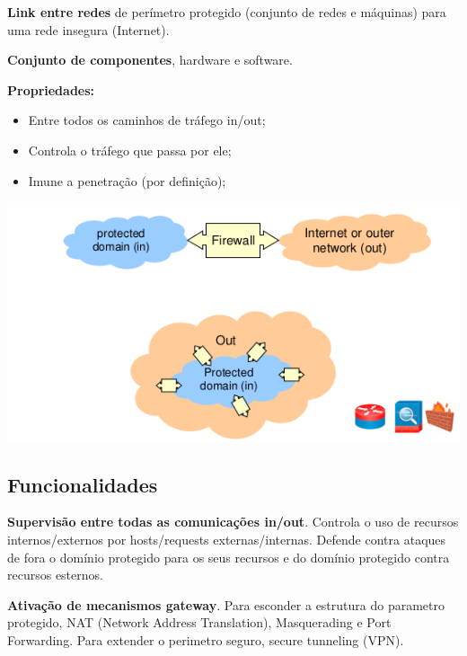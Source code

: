 \documentclass{article}
\begin{document}
\begin{flushleft}
  \textbf{Link entre redes} de perímetro protegido (conjunto de redes e
  máquinas) para uma rede insegura (Internet).

  \vspace{2mm}

  \textbf{Conjunto de componentes}, hardware e software.

  \vspace{2mm}  

  \textbf{Propriedades:}
  \begin{itemize}
    \item Entre todos os caminhos de tráfego in/out;
    \item Controla o tráfego que passa por ele;
    \item Imune a penetração (por definição); 
  \end{itemize}

  \begin{center}
    \includegraphics[scale=0.4]{51}
  \end{center}
\end{flushleft}

\subsection{Funcionalidades}

\begin{flushleft}
  \textbf{Supervisão entre todas as comunicações in/out}. Controla o uso de recursos
  internos/externos por hosts/requests externas/internas. Defende contra ataques de fora
  o domínio protegido para os seus recursos e do domínio protegido contra recursos esternos.

  \vspace{2mm}

  \textbf{Ativação de mecanismos gateway}. Para esconder a estrutura do
  parametro protegido, NAT (Network Address Translation), Masquerading e
  Port Forwarding. Para extender o perimetro seguro, secure tunneling (VPN).
\end{flushleft}
\end{document}
